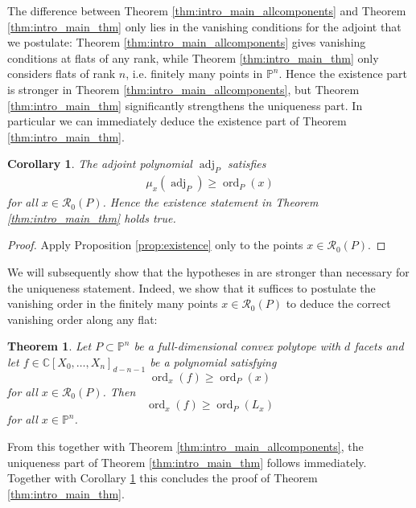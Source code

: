 \documentclass[a4paper,10pt]{amsart}
\theoremstyle{definition}
\theoremstyle{plain}
\newtheorem{thm}[defin]{Theorem}
\newtheorem{cor}[defin]{Corollary}
\newcommand{\ord}{\operatorname{ord}}
\newcommand{\adj}{\operatorname{adj}} %
\newcommand{\cR}{{\mathcal R}}
\newcommand{\C}{{\mathbb C}}
\newcommand{\pp}{\mathbb{P}}
\begin{document}
The difference between Theorem \ref{thm:intro_main_allcomponents} and
Theorem \ref{thm:intro_main_thm} only lies in the vanishing conditions for the adjoint that we postulate: Theorem \ref{thm:intro_main_allcomponents} gives vanishing conditions at flats of any rank, while Theorem \ref{thm:intro_main_thm} only considers flats of rank $n$, i.e. finitely many points in $\pp^n$. Hence the existence part is stronger in Theorem \ref{thm:intro_main_allcomponents}, but Theorem \ref{thm:intro_main_thm} significantly strengthens the uniqueness part. In particular we can immediately deduce the existence part of Theorem \ref{thm:intro_main_thm}.
\begin{cor}
\label{cor:existence}
    The adjoint polynomial $\adj_P$ satisfies \begin{align*}
        \mu_x(\adj_P)\geq \ord_P(x)
    \end{align*} for all $x\in \cR_0(P)$. Hence the existence statement in Theorem \ref{thm:intro_main_thm} holds true. 
\end{cor}
\begin{proof}
    Apply Proposition \ref{prop:existence} only to the points $x \in \cR_0(P)$.
\end{proof}


We will subsequently show that the hypotheses in  are stronger than necessary for the uniqueness statement. Indeed, we show that it suffices to postulate the vanishing order in the finitely many points $x \in \cR_0(P)$ to deduce the correct vanishing order along any flat: 

\begin{thm} \label{thm:pointresidual}
 Let $P \subset \pp^n$ be a full-dimensional convex polytope with $d$ facets and let $f \in \C[X_0, \dots, X_n]_{d-n-1}$ be a polynomial satisfying
 \begin{equation*}
     \ord_x(f) \geq \ord_P(x)
 \end{equation*}
 for all $x \in \cR_0(P)$. Then
 \begin{equation*}
     \ord_x(f) \geq \ord_P(L_x)
 \end{equation*}
 for all $x \in \pp^n$.
\end{thm}

From this together with Theorem \ref{thm:intro_main_allcomponents}, the uniqueness part of Theorem \ref{thm:intro_main_thm} follows immediately. Together with Corollary  \ref{cor:existence} this concludes the proof of Theorem \ref{thm:intro_main_thm}.
\end{document}
